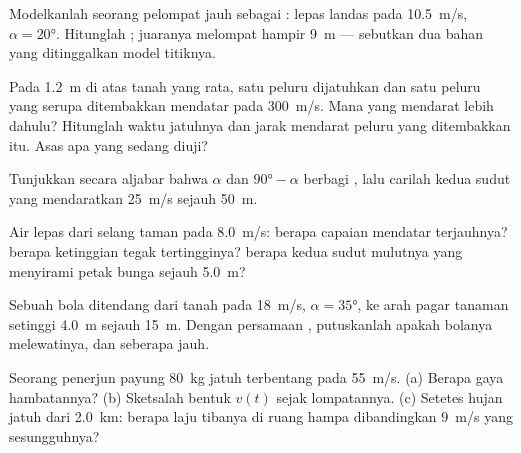 \begin{exercise}[$\star\star$]\label{exo:g12:projectile-motion:9}
Modelkanlah seorang pelompat jauh sebagai : lepas landas pada
\qty{10.5}{m/s}, $\alpha = \ang{20}$. Hitunglah ; juaranya
melompat hampir \qty{9}{m} --- sebutkan dua bahan yang ditinggalkan model titiknya.
\end{exercise}

\begin{exercise}[$\star\star$]\label{exo:g12:projectile-motion:10}
Pada \qty{1.2}{m} di atas tanah yang rata, satu peluru dijatuhkan dan satu
peluru yang serupa ditembakkan mendatar pada \qty{300}{m/s}. Mana yang
mendarat lebih dahulu? Hitunglah waktu jatuhnya dan jarak mendarat peluru
yang ditembakkan itu. Asas apa yang sedang diuji?
\end{exercise}

\begin{exercise}[$\star\star$]\label{exo:g12:projectile-motion:11}
Tunjukkan secara aljabar bahwa $\alpha$ dan $\ang{90} - \alpha$ berbagi
, lalu carilah kedua sudut yang mendaratkan 
\qty{25}{m/s} sejauh \qty{50}{m}.
\end{exercise}

\begin{exercise}[$\star\star\star$]\label{exo:g12:projectile-motion:12}
Air lepas dari selang taman pada \qty{8.0}{m/s}: berapa capaian mendatar
terjauhnya? berapa ketinggian tegak tertingginya? berapa kedua sudut
mulutnya yang menyirami petak bunga sejauh \qty{5.0}{m}?
\end{exercise}

\begin{exercise}[$\star\star\star$]\label{exo:g12:projectile-motion:13}
Sebuah bola ditendang dari tanah pada \qty{18}{m/s}, $\alpha = \ang{35}$,
ke arah pagar tanaman setinggi \qty{4.0}{m} sejauh \qty{15}{m}. Dengan
persamaan , putuskanlah apakah bolanya melewatinya, dan seberapa jauh.
\end{exercise}

\begin{exercise}[$\star\star\star$]\label{exo:g12:projectile-motion:14}
Seorang penerjun payung \qty{80}{kg} jatuh terbentang pada 
\qty{55}{m/s}. (a) Berapa gaya hambatannya? (b) Sketsalah bentuk $v(t)$
sejak lompatannya. (c) Setetes hujan jatuh dari \qty{2.0}{km}: berapa laju
tibanya di ruang hampa dibandingkan \qty{9}{m/s} yang sesungguhnya?
\end{exercise}

